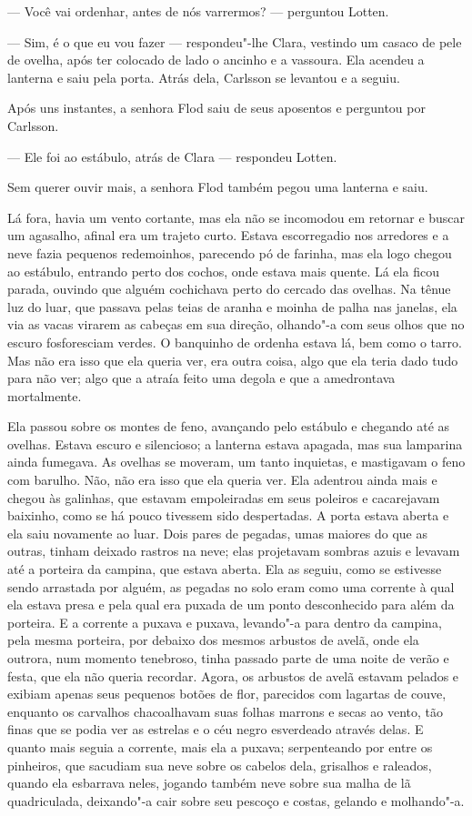 --- Você vai ordenhar, antes de nós varrermos? --- perguntou Lotten.

--- Sim, é o que eu vou fazer --- respondeu"-lhe Clara, vestindo um casaco de pele
de ovelha, após ter colocado de lado o ancinho e a vassoura. Ela acendeu a
lanterna e saiu pela porta. Atrás dela, Carlsson se levantou e a seguiu.

Após uns instantes, a senhora Flod saiu de seus aposentos e perguntou por
Carlsson.

--- Ele foi ao estábulo, atrás de Clara --- respondeu Lotten.

Sem querer ouvir mais, a senhora Flod também pegou uma lanterna e saiu.

Lá fora, havia um vento cortante, mas ela não se incomodou em retornar e buscar
um agasalho, afinal era um trajeto curto. Estava escorregadio nos arredores e a
neve fazia pequenos redemoinhos, parecendo pó de farinha, mas ela logo chegou  ao
estábulo, entrando perto dos cochos, onde estava mais quente. Lá ela ficou
parada, ouvindo que alguém cochichava perto do cercado das ovelhas. Na tênue luz
do luar, que passava pelas teias de aranha e moinha de palha nas janelas, ela
via as vacas virarem as cabeças em sua direção, olhando"-a com seus olhos que no
escuro fosforesciam verdes. O banquinho de ordenha estava lá, bem como o tarro.
Mas não era isso que ela queria ver, era outra coisa, algo que ela teria dado
tudo para não ver; algo que a atraía feito uma degola e que a amedrontava
mortalmente.

Ela passou sobre os montes de feno, avançando pelo estábulo e chegando até as
ovelhas. Estava escuro e silencioso; a lanterna estava apagada, mas sua lamparina
ainda fumegava. As ovelhas se moveram, um tanto inquietas, e mastigavam o feno com barulho. 
Não, não era isso que ela queria ver. Ela adentrou ainda mais e chegou às galinhas, que
estavam empoleiradas em seus poleiros e cacarejavam baixinho, como se há pouco
tivessem sido despertadas. A porta estava aberta e ela saiu novamente ao luar.
Dois pares de pegadas, umas maiores do que as outras, tinham deixado rastros na
neve; elas projetavam sombras azuis e levavam até a porteira da campina, que
estava aberta. Ela as seguiu, como se estivesse sendo arrastada por alguém, as
pegadas no solo eram como uma corrente à qual ela estava presa e pela qual era
puxada de um ponto desconhecido para além da porteira. E a corrente a puxava e
puxava, levando"-a para dentro da campina, pela mesma porteira, por debaixo dos
mesmos arbustos de avelã, onde ela outrora, num momento tenebroso, tinha passado
parte de uma noite de verão e festa, que ela não queria recordar. Agora, os
arbustos de avelã estavam pelados e exibiam apenas seus pequenos botões de flor,
parecidos com lagartas de couve, enquanto os carvalhos chacoalhavam suas folhas
marrons e secas ao vento, tão finas que se podia ver as estrelas e o céu negro
esverdeado através delas. E quanto mais seguia a corrente, mais ela a puxava;
serpenteando por entre os pinheiros, que sacudiam sua neve sobre os cabelos
dela, grisalhos e raleados, quando ela esbarrava neles, jogando também neve sobre
sua malha de lã quadriculada, deixando"-a cair sobre seu pescoço e costas,
gelando e molhando"-a.

